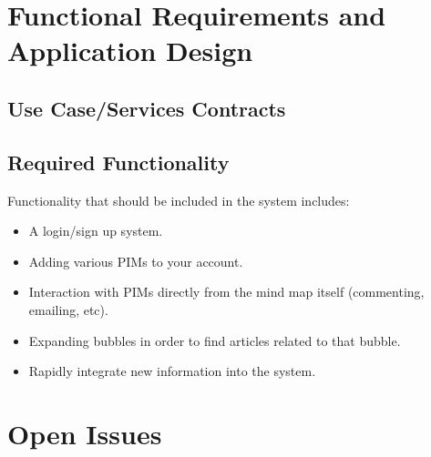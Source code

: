\documentclass[hidelinks,english]{article}
\begin{document}
	\section{Functional Requirements and Application Design}		
		
		\subsection{Use Case/Services Contracts}
	
	
		\subsection{Required Functionality}
			Functionality that should be included in the system includes:
			\begin{itemize}
			\item A login/sign up system. 
			\item Adding various PIMs to your account.
			\item Interaction with PIMs directly from the mind map itself (commenting, emailing, etc).
			\item Expanding bubbles in order to find articles related to that bubble.
			\item Rapidly integrate new information into the system.
			\end{itemize}
	
	\section{Open Issues}
	
\end{document}
